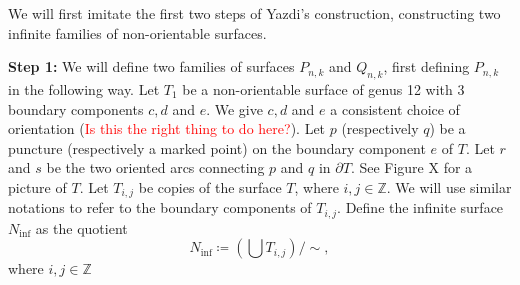 We will first imitate the first two steps of Yazdi's construction, constructing two infinite families of non-orientable surfaces.

\textbf{Step 1:} We will define two families of surfaces $P_{n,k}$ and $Q_{n,k}$, first defining $P_{n,k}$ in the following way. Let $T_1$ be a non-orientable surface of genus 12 with 3 boundary components $c,d$ and $e$. We give $c, d$ and $e$ a consistent choice of orientation (\textcolor{red}{Is this the right thing to do here?}). Let $p$ (respectively $q$) be a puncture (respectively a marked point) on the boundary component $e$ of $T$. Let $r$ and $s$ be the two oriented arcs connecting $p$ and $q$ in $\partial T$. See Figure X for a picture of $T$. Let $T_{i,j}$ be copies of the surface $T$, where $i,j \in \mathbb{Z}$. We will use similar notations to refer to the boundary components of $T_{i,j}$. Define the infinite surface $N_{\inf}$ as the quotient $$N_{\inf} \coloneqq \left( \bigcup T_{i,j} \right)/\sim,$$ where $i,j \in \mathbb{Z}$